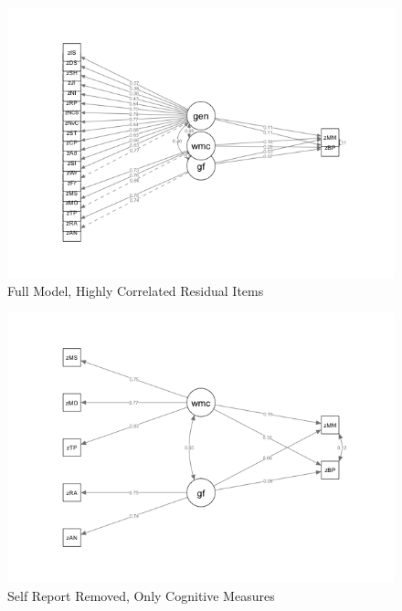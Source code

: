 \documentclass[12pt,]{book}
\begin{document}
\begin{figure}

{\centering \includegraphics[width=1\linewidth]{img/sem2} 

}

\caption{Full Model, Highly Correlated Residual Items}\label{fig:model2}
\end{figure}

\begin{figure}

{\centering \includegraphics[width=1\linewidth]{img/sem3} 

}

\caption{Self Report Removed, Only Cognitive Measures}\label{fig:model3}
\end{figure}
\end{document}
